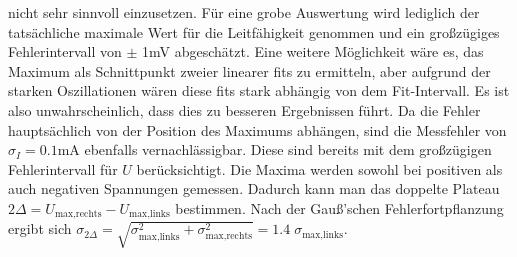 \documentclass[twoside,        %
               BCOR12mm,       %
               english,ngerman, %
               fleqn,headsepline=false,footsepline=false
              ]{Vorlage/MFPREPORT}
\begin{document}
nicht sehr sinnvoll einzusetzen. Für eine grobe Auswertung wird lediglich der
tatsächliche maximale Wert für die Leitfähigkeit genommen und ein großzügiges
Fehlerintervall von $\pm$ 1\;mV abgeschätzt. Eine weitere Möglichkeit wäre es,
das Maximum als Schnittpunkt zweier linearer fits zu ermitteln, aber aufgrund
der starken Oszillationen wären diese fits stark abhängig von dem
Fit-Intervall. Es ist also unwahrscheinlich, dass dies zu besseren Ergebnissen
führt. Da die Fehler hauptsächlich von der Position des Maximums abhängen, sind
die Messfehler von $\sigma_I=0.1$\;mA ebenfalls vernachlässigbar. Diese sind
bereits mit dem großzügigen Fehlerintervall für $U$ berücksichtigt. Die Maxima
werden sowohl bei positiven als auch negativen Spannungen gemessen. Dadurch
kann man das doppelte Plateau $2\Delta=U_{\text{max,rechts}}-U_{\text{max,links}}$ bestimmen.
Nach der Gauß'schen Fehlerfortpflanzung ergibt sich
$\sigma_{2\Delta}=\sqrt{\sigma_{\text{max,links}}^2+\sigma_{\text{max,rechts}}^2}=1.4\;\sigma_{\text{max,links}}$.
\end{document}
